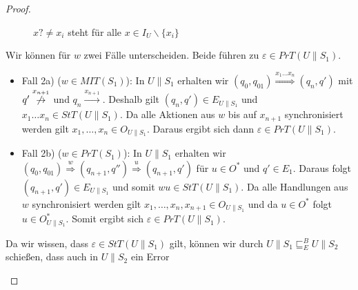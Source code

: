 \begin{proof}
\begin{itemize}
\begin{figure} [h!tbp]
\begin{center}
        \caption{$x?\neq x_i$ steht für alle $x\in I_U\backslash\{x_i\}$}
        \label{UohneE}
      \end{center}
      \end{figure}
      Wir können für $w$ zwei Fälle unterscheiden. Beide führen zu
      $\varepsilon\in PrT(U\|S_1)$.
      \begin{itemize}
        \item Fall 2a) ($w\in MIT(S_1)$): In $U\|S_1$ erhalten wir
          $(q_0,q_{01}) \overset{x_1\dots x_n}{\Rightarrow} (q_n,q')$ mit
          $q' \overset{x_{n+1}}{\not{\hspace{-0.1cm}\rightarrow}}$ und $q_n
          \overset{x_{n+1}}{\rightarrow}$. Deshalb gilt $(q_n,q')\in
          E_{U\|S_1}$ und $x_1\dots x_n\in StT(U\|S_1)$. Da alle Aktionen aus
          $w$ bis auf $x_{n+1}$ synchronisiert werden gilt $x_1,\dots ,x_n\in
          O_{U\|S_1}$. Daraus ergibt sich dann $\varepsilon\in PrT(U\|S_1)$.
        \item Fall 2b) ($w\in PrT(S_1)$): In $U\|S_1$ erhalten wir
          $(q_0,q_{01}) \overset{w}{\Rightarrow} (q_{n+1},q'')
          \overset{u}{\Rightarrow} (q_{n+1},q')$ für $u\in O^*$ und $q'\in
          E_1$. Daraus folgt $(q_{n+1},q')\in E_{U\|S_1}$ und somit $wu\in
          StT(U\|S_1)$. Da alle Handlungen aus $w$ synchronisiert werden gilt
          $x_1,\dots ,x_n,x_{n+1}\in O_{U\|S_1}$ und da $u\in O^*$ folgt
          $u\in O_{U\|S_1}^*$. Somit ergibt sich $\varepsilon\in
          PrT(U\|S_1)$.
      \end{itemize}
      Da wir wissen, dass $\varepsilon\in StT(U\|S_1)$ gilt, können wir durch
      $U\|S_1\sqsubseteq _E^B U\|S_2$ schießen, dass auch in $U\|S_2$ ein Error

\end{itemize}
\end{proof}
